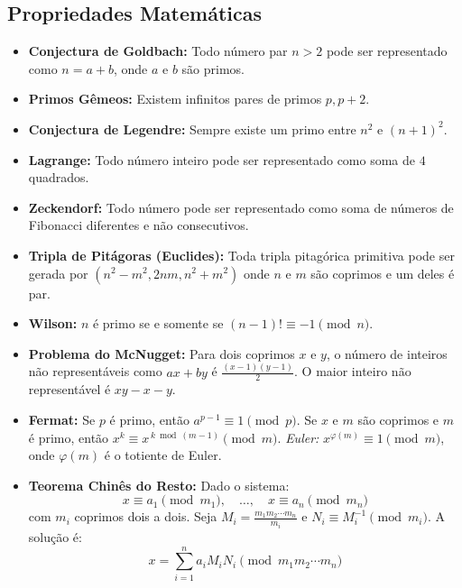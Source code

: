 \documentclass[12pt,a4paper]{article}
\begin{document}
\subsection{Propriedades Matemáticas}

\begin{small}
\begin{itemize}
    \item \textbf{Conjectura de Goldbach:} Todo número par $n > 2$ pode ser representado como $n = a + b$, onde $a$ e $b$ são primos.

    \item \textbf{Primos Gêmeos:} Existem infinitos pares de primos $p, p + 2$.

    \item \textbf{Conjectura de Legendre:} Sempre existe um primo entre $n^2$ e $(n+1)^2$.

    \item \textbf{Lagrange:} Todo número inteiro pode ser representado como soma de $4$ quadrados.

    \item \textbf{Zeckendorf:} Todo número pode ser representado como soma de números de Fibonacci diferentes e não consecutivos.

    \item \textbf{Tripla de Pitágoras (Euclides):} Toda tripla pitagórica primitiva pode ser gerada por $(n^2 - m^2, 2nm, n^2 + m^2)$ onde $n$ e $m$ são coprimos e um deles é par.

    \item \textbf{Wilson:} $n$ é primo se e somente se $(n-1)! \equiv -1 \pmod{n}$.

    \item \textbf{Problema do McNugget:} Para dois coprimos $x$ e $y$, o número de inteiros não representáveis como $ax + by$ é $\tfrac{(x-1)(y-1)}{2}$. O maior inteiro não representável é $xy - x - y$.

    \item \textbf{Fermat:} Se $p$ é primo, então $a^{p-1} \equiv 1 \pmod{p}$.  
          Se $x$ e $m$ são coprimos e $m$ é primo, então $x^k \equiv x^{\,k \bmod (m-1)} \pmod m$.  
          \textit{Euler:} $x^{\varphi(m)} \equiv 1 \pmod m$, onde $\varphi(m)$ é o totiente de Euler.

    \item \textbf{Teorema Chinês do Resto:}  
    Dado o sistema:
    \[
    x \equiv a_1 \pmod{m_1}, \quad \ldots, \quad x \equiv a_n \pmod{m_n}
    \]
    com $m_i$ coprimos dois a dois.  
    Seja $M_i = \tfrac{m_1 m_2 \cdots m_n}{m_i}$ e $N_i \equiv M_i^{-1} \pmod{m_i}$.  
    A solução é:
    \[
    x = \sum_{i=1}^{n} a_i M_i N_i \pmod{m_1 m_2 \cdots m_n}
    \]


\end{itemize}
\end{small}
\end{document}
